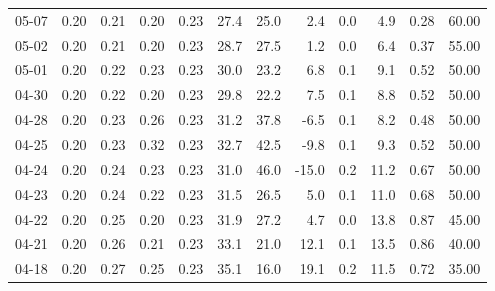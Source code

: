 \begin{threeparttable}
{\begin{tabular}{lrrrrrrrrrrr}
  05-07 &          0.20 &          0.21 &          0.20 &        0.23 &                27.4 &                25.0 &        2.4 &                 0.0 &              4.9 &            0.28 &                  60.00 \\
  05-02 &          0.20 &          0.21 &          0.20 &        0.23 &                28.7 &                27.5 &        1.2 &                 0.0 &              6.4 &            0.37 &                  55.00 \\
  05-01 &          0.20 &          0.22 &          0.23 &        0.23 &                30.0 &                23.2 &        6.8 &                 0.1 &              9.1 &            0.52 &                  50.00 \\
  04-30 &          0.20 &          0.22 &          0.20 &        0.23 &                29.8 &                22.2 &        7.5 &                 0.1 &              8.8 &            0.52 &                  50.00 \\
  04-28 &          0.20 &          0.23 &          0.26 &        0.23 &                31.2 &                37.8 &       -6.5 &                 0.1 &              8.2 &            0.48 &                  50.00 \\
  04-25 &          0.20 &          0.23 &          0.32 &        0.23 &                32.7 &                42.5 &       -9.8 &                 0.1 &              9.3 &            0.52 &                  50.00 \\
  04-24 &          0.20 &          0.24 &          0.23 &        0.23 &                31.0 &                46.0 &      -15.0 &                 0.2 &             11.2 &            0.67 &                  50.00 \\
  04-23 &          0.20 &          0.24 &          0.22 &        0.23 &                31.5 &                26.5 &        5.0 &                 0.1 &             11.0 &            0.68 &                  50.00 \\
  04-22 &          0.20 &          0.25 &          0.20 &        0.23 &                31.9 &                27.2 &        4.7 &                 0.0 &             13.8 &            0.87 &                  45.00 \\
  04-21 &          0.20 &          0.26 &          0.21 &        0.23 &                33.1 &                21.0 &       12.1 &                 0.1 &             13.5 &            0.86 &                  40.00 \\
  04-18 &          0.20 &          0.27 &          0.25 &        0.23 &                35.1 &                16.0 &       19.1 &                 0.2 &             11.5 &            0.72 &                  35.00 \\

\end{tabular}}
\end{threeparttable}
